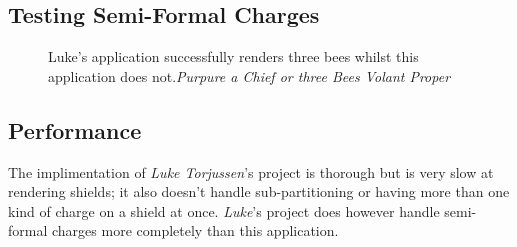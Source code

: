 \subsection{Testing Semi-Formal Charges}

\begin{figure}[H]
\hfill
{}
\hfill
\caption{Luke's application successfully renders three bees whilst this application does not.\emph{Purpure a Chief or three Bees Volant Proper }}
\end{figure}


\subsection{Performance}
The implimentation of \emph{Luke Torjussen}'s project is thorough but is very slow at rendering shields; it also doesn't handle sub-partitioning or having more than one kind of charge on a shield at once.   \emph{Luke}'s project does however handle semi-formal charges more completely than this application.  